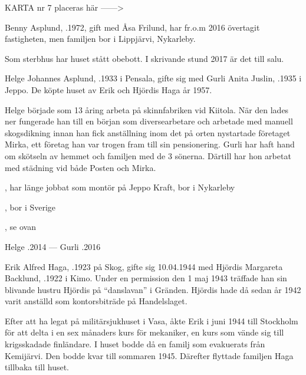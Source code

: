 
KARTA nr 7 placeras här ------>





Benny Asplund, .1972, gift med Åsa Frilund, har fr.o.m 2016 övertagit fastigheten, men familjen bor i Lippjärvi, Nykarleby. \jhvspace{}


Som sterbhus har huset stått obebott. I skrivande stund 2017 är det till salu. \jhvspace{}



Helge Johannes Asplund, .1933 i Pensala, gifte sig med Gurli Anita Juslin, .1935 i Jeppo. De köpte huset av Erik och Hjördis Haga år 1957.

Helge började som 13 åring arbeta på skinnfabriken vid Kiitola. När den lades ner fungerade han till en början som diversearbetare och arbetade med manuell skogsdikning innan han fick anställning inom det på orten nystartade företaget Mirka, ett företag han var trogen fram till sin pensionering. Gurli har haft hand om skötseln av hemmet och familjen med de 3 sönerna. Därtill har hon arbetat med städning vid både Posten och Mirka.
\begin{jhchildren}
  \item {}, har länge jobbat som montör på Jeppo Kraft, bor i Nykarleby
  \item {}, bor i Sverige
  \item {}, se ovan
\end{jhchildren}

Helge .2014  ---  Gurli .2016


Erik Alfred Haga, .1923 på Skog, gifte sig 10.04.1944 med Hjördis Margareta Backlund, .1922 i Kimo. Under en permission den 1 maj 1943 träffade han sin blivande hustru Hjördis på ``danslavan'' i Gränden. Hjördis hade då sedan år 1942 varit anställd som kontorsbiträde på Handelslaget.

Efter att ha legat på militärsjukhuset i Vasa, åkte Erik i juni 1944 till Stockholm för att delta i en sex månaders kurs för mekaniker, en kurs som vände sig till krigsskadade finländare. I huset bodde då en familj som evakuerats från Kemijärvi. Den bodde kvar till sommaren 1945. Därefter flyttade familjen Haga tillbaka till huset.

